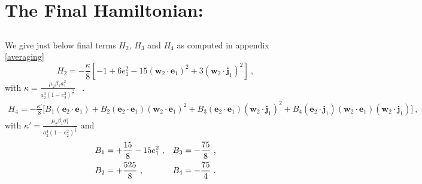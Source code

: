 \documentclass[a4paper]{article}
\begin{document}
\section{The Final Hamiltonian: }
\label{Hfinal}
\subsection{}
We give just below final terms $H_{2}$, $H_{3}$ and $H_{4}$ as computed in appendix \ref{averaging}
\begin{equation}
 H_{2}=-\frac{\kappa}{8} \left[ -1+6e_{1}^{2} -15(\mathbf w_{2} \cdot \mathbf e_{1})^{2} +3(\mathbf w_{2} \cdot \mathbf j_{1})^{2} \right] \ ,
\end{equation}
with $\kappa=\frac{\mu_{2}\beta_{1}a_{1}^{2}}{a_{2}^{3}(1-e_{2}^{2})^\frac{3}{2}}$ \ .
\begin{align}
H_{4}=-\frac{\kappa'}{8} \bigg[
 B_{1}(\mathbf e_{2} \cdot \mathbf e_{1})
+B_{2}(\mathbf e_{2} \cdot \mathbf e_{1})(\mathbf w_{2} \cdot \mathbf e_{1})^{2} 
+B_{3}(\mathbf e_{2} \cdot \mathbf e_{1})(\mathbf w_{2} \cdot \mathbf j_{1})^{2}
+B_{4}(\mathbf e_{2} \cdot \mathbf j_{1})(\mathbf w_{2} \cdot \mathbf e_{1})(\mathbf w_{2} \cdot \mathbf j_{1})
\bigg ] \ ,
\end{align}
with $\kappa'=\frac{\mu_{2}\beta_{1}a_{1}^{3}}{a_{2}^{4}(1-e_{2}^{2})^{\frac{5}{2}}}$ and
\begin{align}
B_{1}&=+\frac{15}{8}-15e_{1}^{2} \ , &B_{3}&=-\frac{75}{8}   \ , \notag \\
B_{2}&=+\frac{525}{8}   \ ,                     &B_{4}&=-\frac{75}{4}  \ .   
\end{align}
\end{document}
